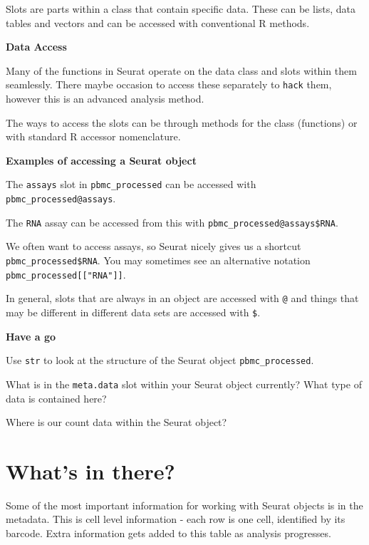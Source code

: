\documentclass[
]{book}
\begin{document}
Slots are parts within a class that contain specific data. These can be lists, data tables and vectors and can be accessed with conventional R methods.

\textbf{Data Access}

Many of the functions in Seurat operate on the data class and slots within them seamlessly. There maybe occasion to access these separately to \texttt{hack} them, however this is an advanced analysis method.

The ways to access the slots can be through methods for the class (functions) or with standard R accessor nomenclature.

\textbf{Examples of accessing a Seurat object}

The \texttt{assays} slot in \texttt{pbmc\_processed} can be accessed with \texttt{pbmc\_processed@assays}.

The \texttt{RNA} assay can be accessed from this with \texttt{pbmc\_processed@assays\$RNA}.

We often want to access assays, so Seurat nicely gives us a shortcut \texttt{pbmc\_processed\$RNA}. You may sometimes see an alternative notation \texttt{pbmc\_processed{[}{[}"RNA"{]}{]}}.

In general, slots that are always in an object are accessed with \texttt{@} and things that may be different in different data sets are accessed with \texttt{\$}.

\textbf{Have a go}

Use \texttt{str} to look at the structure of the Seurat object \texttt{pbmc\_processed}.

What is in the \texttt{meta.data} slot within your Seurat object currently? What type of data is contained here?

Where is our count data within the Seurat object?

\hypertarget{whats-in-there}{%
\section{What's in there?}\label{whats-in-there}}

Some of the most important information for working with Seurat objects is in the metadata.
This is cell level information - each row is one cell, identified by its barcode.
Extra information gets added to this table as analysis progresses.
\end{document}
